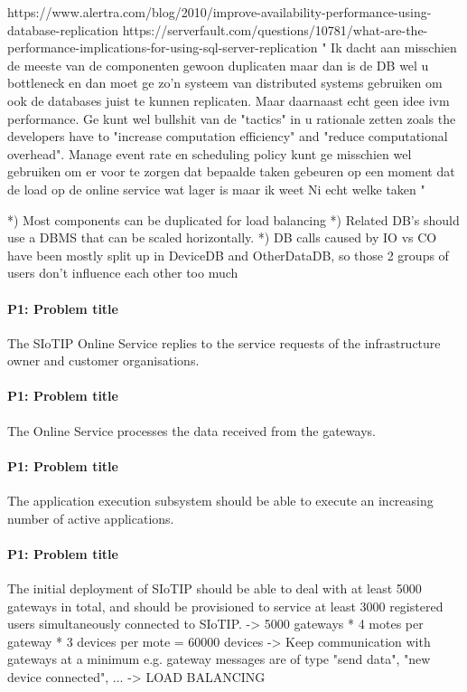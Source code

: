     https://www.alertra.com/blog/2010/improve-availability-performance-using-database-replication
    https://serverfault.com/questions/10781/what-are-the-performance-implications-for-using-sql-server-replication
    "
    Ik dacht aan misschien de meeste van de componenten gewoon duplicaten maar dan is de DB wel u bottleneck en dan moet ge zo'n systeem van distributed systems gebruiken om ook de databases juist te kunnen replicaten.
    Maar daarnaast echt geen idee ivm performance. Ge kunt wel bullshit van de "tactics" in u rationale zetten zoals the developers have to "increase computation efficiency" and "reduce computational overhead".
    Manage event rate en scheduling policy kunt ge misschien wel gebruiken om er voor te zorgen dat bepaalde taken gebeuren op een moment dat de load op de online service wat lager is maar ik weet Ni echt welke taken
    "

    *) Most components can be duplicated for load balancing
    *) Related DB's should use a DBMS that can be scaled horizontally.
    *) DB calls caused by IO vs CO have been mostly split up in DeviceDB and OtherDataDB, so those 2 groups of
       users don't influence each other too much


    \paragraph{P1: Problem title}
        The SIoTIP Online Service replies to the service requests of the
        infrastructure owner and customer organisations.

    \paragraph{P1: Problem title}
        The Online Service processes the data received from the gateways.

    \paragraph{P1: Problem title}
        The application execution subsystem should be able to execute an increasing
        number of active applications.

    \paragraph{P1: Problem title}
        The initial deployment of SIoTIP should be able to deal with at least 5000
        gateways in total, and should be provisioned to service at least 3000
        registered users simultaneously connected to SIoTIP.
        -> 5000 gateways * 4 motes per gateway * 3 devices per mote = 60000 devices
        -> Keep communication with gateways at a minimum
           e.g. gateway messages are of type "send data", "new device connected", ...
        -> LOAD BALANCING


